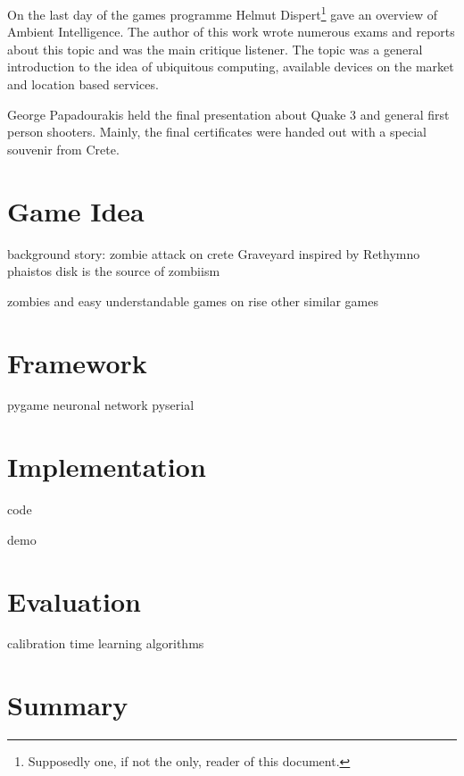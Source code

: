 \documentclass[bibtotocnumbered, headsepline,normalheadings,12pt]{report}
\begin{document}
On the last day of the games programme Helmut Dispert\footnote{Supposedly one, if not the only, reader of this document.} gave an overview of 
Ambient Intelligence. The author of this work wrote numerous exams and reports about this topic and was the main  critique listener.  
The topic was a general introduction to the idea of ubiquitous computing, available devices on the market and location based services.

George Papadourakis held the final presentation about Quake 3 and general first person shooters. Mainly, the final certificates were handed out 
with a special souvenir from Crete.


\chapter{Game Idea}
\label{chap:idea}

background story:
zombie attack on crete
Graveyard inspired by Rethymno
phaistos disk is the source of zombiism

zombies and easy understandable games on rise
other similar games


\chapter{Framework}
\label{chap:framework}

pygame
neuronal network
pyserial

\chapter{Implementation}
\label{chap:impl}

code

demo

\chapter{Evaluation}
\label{chap:eva}

calibration time
learning algorithms

\chapter{Summary}
\label{chap:sum}

\nocite{*}


\listoffigures
\lstlistoflistings
\begingroup \let\clearpage\relax
\listoftables \endgroup
\end{document}
